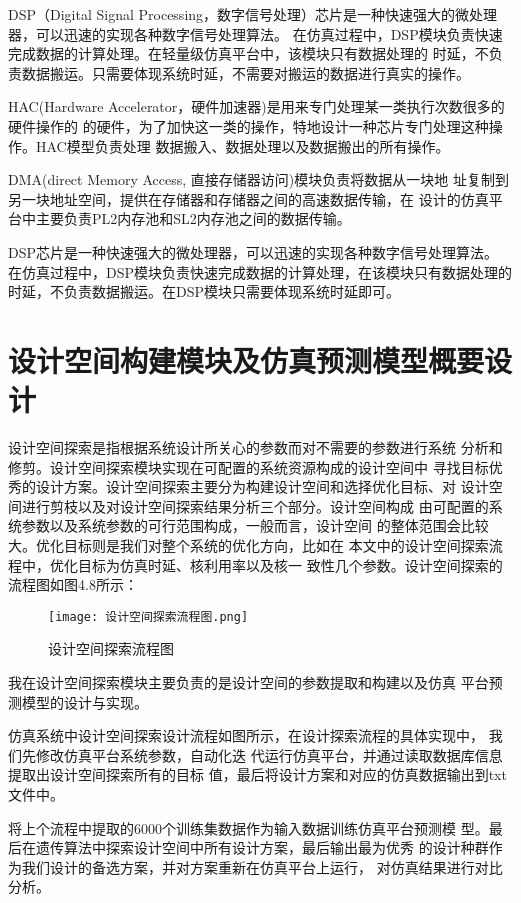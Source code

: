 DSP（Digital Signal Processing，数字信号处理）芯片是一种快速强大的微处理器，可以迅速的实现各种数字信号处理算法。
在仿真过程中，DSP模块负责快速完成数据的计算处理。在轻量级仿真平台中，该模块只有数据处理的
时延，不负责数据搬运。只需要体现系统时延，不需要对搬运的数据进行真实的操作。

HAC(Hardware Accelerator，硬件加速器)是用来专门处理某一类执行次数很多的硬件操作的
的硬件，为了加快这一类的操作，特地设计一种芯片专门处理这种操作。HAC模型负责处理
数据搬入、数据处理以及数据搬出的所有操作。

DMA(direct Memory Access, 直接存储器访问)模块负责将数据从一块地
址复制到另一块地址空间，提供在存储器和存储器之间的高速数据传输，在
设计的仿真平台中主要负责PL2内存池和SL2内存池之间的数据传输。

DSP芯片是一种快速强大的微处理器，可以迅速的实现各种数字信号处理算法。
在仿真过程中，DSP模块负责快速完成数据的计算处理，在该模块只有数据处理的
时延，不负责数据搬运。在DSP模块只需要体现系统时延即可。

\section{设计空间构建模块及仿真预测模型概要设计}
设计空间探索是指根据系统设计所关心的参数而对不需要的参数进行系统
分析和修剪。设计空间探索模块实现在可配置的系统资源构成的设计空间中
寻找目标优秀的设计方案。设计空间探索主要分为构建设计空间和选择优化目标、对
设计空间进行剪枝以及对设计空间探索结果分析三个部分。设计空间构成
由可配置的系统参数以及系统参数的可行范围构成，一般而言，设计空间
的整体范围会比较大。优化目标则是我们对整个系统的优化方向，比如在
本文中的设计空间探索流程中，优化目标为仿真时延、核利用率以及核一
致性几个参数。设计空间探索的流程图如图4.8所示：

\begin{figure}[htb]
    \centering
    \texttt{[image: 设计空间探索流程图.png]}
    \caption{设计空间探索流程图}
    \label{fig:badge}
\end{figure}

我在设计空间探索模块主要负责的是设计空间的参数提取和构建以及仿真
平台预测模型的设计与实现。

仿真系统中设计空间探索设计流程如图所示，在设计探索流程的具体实现中，
我们先修改仿真平台系统参数，自动化迭
代运行仿真平台，并通过读取数据库信息提取出设计空间探索所有的目标
值，最后将设计方案和对应的仿真数据输出到txt文件中。

将上个流程中提取的6000个训练集数据作为输入数据训练仿真平台预测模
型。最后在遗传算法中探索设计空间中所有设计方案，最后输出最为优秀
的设计种群作为我们设计的备选方案，并对方案重新在仿真平台上运行，
对仿真结果进行对比分析。


